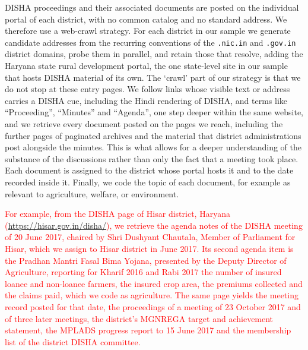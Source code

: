 \documentclass[12pt]{article}
\begin{document}
DISHA proceedings and their associated documents are posted on the individual portal of each district, with no common catalog and no standard address. We therefore use a web-crawl strategy. For each district in our sample we generate candidate addresses from the recurring conventions of the \texttt{.nic.in} and \texttt{.gov.in} district domains, probe them in parallel, and retain those that resolve, adding the Haryana state rural development portal, the one state-level site in our sample that hosts DISHA material of its own. The `crawl' part of our strategy is that we do not stop at these entry pages. We follow links whose visible text or address carries a DISHA cue, including the Hindi rendering of DISHA, and  terms like ``Proceeding'', ``Minutes'' and ``Agenda'', one step deeper within the same website, and we retrieve every document posted on the pages we reach, including the further pages of paginated archives and the material that district administrations post alongside the minutes. This is what allows for a deeper understanding of the substance of the discussions rather than only the fact that a meeting took place. Each document is assigned to the district whose portal hosts it and to the date recorded inside it. Finally, we code the topic of each document, for example as relevant to agriculture, welfare, or environment.

\textcolor{red}{For example, from the DISHA page of Hisar district, Haryana (\url{https://hisar.gov.in/disha/}), we retrieve the agenda notes of the DISHA meeting of 20 June 2017, chaired by Shri Dushyant Chautala, Member of Parliament for Hisar, which we assign to Hisar district in June 2017. Its second agenda item is the Pradhan Mantri Fasal Bima Yojana, presented by the Deputy Director of Agriculture, reporting for Kharif 2016 and Rabi 2017 the number of insured loanee and non-loanee farmers, the insured crop area, the premiums collected and the claims paid, which we code as agriculture. The same page yields the meeting record posted for that date, the proceedings of a meeting of 23 October 2017 and of three later meetings, the district's MGNREGA target and achievement statement, the MPLADS progress report to 15 June 2017 and the membership list of the district DISHA committee.}
\end{document}

